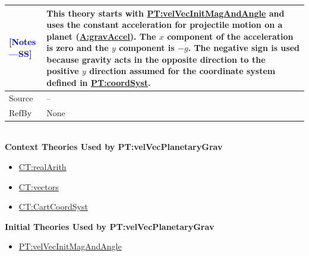\documentclass[12pt]{article}
\newcommand{\authornote}[3]{\textcolor{#1}{[#3 ---#2]}}
\newcommand{\authornote}[3]{}
\newcommand{\wss}[1]{\authornote{blue}{SS}{#1}}
\begin{document}
\begin{minipage}{\textwidth}
\begin{tabular}{>{\raggedright}p{}>{\raggedright\arraybackslash}p{}}
\\ \midrule \wss{Notes} & This theory starts with
\hyperref[PT:velVecInitMagAndAngle]{PT:velVecInitMagAndAngle} and uses the
constant acceleration for projectile motion on a planet
(\hyperref[gravAccel]{A:gravAccel}).  The $x$ component of the acceleration is
zero and the $y$ component is $-g$.  The negative sign is used because gravity
acts in the opposite direction to the positive $y$ direction assumed for the
coordinate system defined in \hyperref[PT:coordSyst]{PT:coordSyst}.

\\ \midrule
Source & --
         
\\ \midrule
RefBy & None

\\ \bottomrule
\end{tabular}
\end{minipage}
~\\

\noindent \textbf{Context Theories Used by PT:velVecPlanetaryGrav}

\begin{itemize}
\item \hyperref[CT:realArith]{CT:realArith}
\item \hyperref[CT:vectors]{CT:vectors}
\item \hyperref[CT:CartCoordSyst]{CT:CartCoordSyst}
\end{itemize}

\noindent \textbf{Initial Theories Used by PT:velVecPlanetaryGrav}

\begin{itemize}
\item \hyperref[PT:velVecInitMagAndAngle]{PT:velVecInitMagAndAngle}
\end{itemize}
\end{document}

